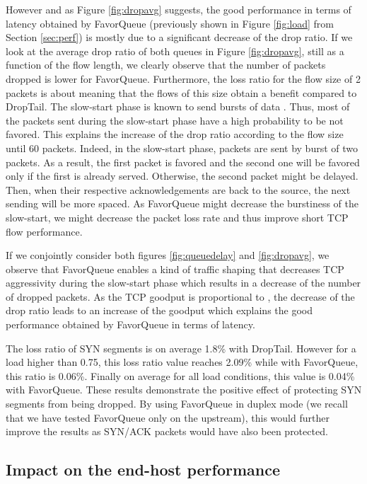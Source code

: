 \documentclass{elsart}
\begin{document}
However and as Figure \ref{fig:dropavg} suggests, the good performance in terms of latency obtained by FavorQueue (previously shown in Figure \ref{fig:load} from Section \ref{sec:perf}) is mostly due to a 
significant decrease of the drop ratio. If we look at the average drop ratio of both queues in Figure \ref{fig:dropavg}, still as a function of the flow length,  
we clearly observe that the number of packets dropped is lower for FavorQueue. Furthermore, the loss ratio for the flow size of 2 packets is about  meaning that the flows of this size obtain a benefit compared to DropTail.
The slow-start phase is known to send bursts of data \cite{Barakat00}. Thus, most of the packets sent during the slow-start phase have a high probability to be not favored. This explains the increase of the drop ratio according 
to the flow size until 60 packets.
Indeed, in the slow-start phase, packets are sent by burst of two packets. As a result, the first packet is favored and the second
one will be favored only if the first is already served. Otherwise, the second packet might be delayed. Then, when their respective acknowledgements are back to the source, the next sending will be more spaced. 
As FavorQueue might decrease the burstiness of the slow-start, we might decrease the packet loss rate and thus improve short TCP flow performance.

If we conjointly consider both figures \ref{fig:queuedelay} and \ref{fig:dropavg}, we observe that FavorQueue enables a kind of traffic shaping that decreases TCP aggressivity during the slow-start phase which results in a 
decrease of the number of dropped packets. As the TCP goodput is proportional to  \cite{mathis97macroscopic}, the decrease of the drop ratio leads to an increase of the goodput which explains the good 
performance obtained by FavorQueue in terms of latency.

The loss ratio of SYN segments is on average 1.8\% with DropTail. However for a load higher than 0.75, this loss ratio value reaches 2.09\% while with FavorQueue, this ratio is 0.06\%. Finally on average for all load conditions, this value is 0.04\% with FavorQueue. These results demonstrate the positive effect of protecting SYN segments from being dropped. By using FavorQueue in duplex mode (we recall that we have tested FavorQueue only on the upstream), this would further improve the results as SYN/ACK packets would have also been protected.


\subsection{Impact on the end-host performance}
\end{document}
